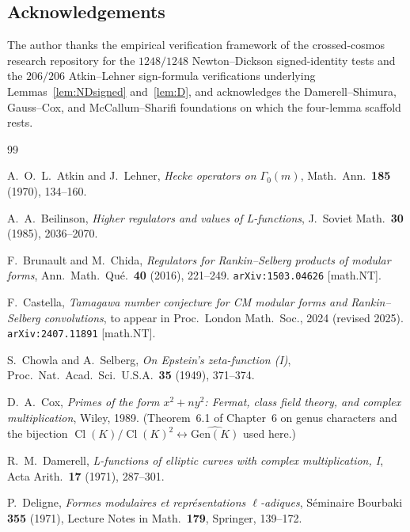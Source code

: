 \documentclass[11pt,a4paper]{amsart}
\theoremstyle{plain}
\theoremstyle{definition}
\DeclareMathOperator{\Cl}{Cl}
\begin{document}
\subsection*{Acknowledgements}

The author thanks the empirical verification framework of the
crossed-cosmos research repository for the $1248/1248$ Newton--Dickson
signed-identity tests and the $206/206$ Atkin--Lehner sign-formula
verifications underlying Lemmas~\ref{lem:NDsigned} and~\ref{lem:D},
and acknowledges the Damerell--Shimura, Gauss--Cox, and
McCallum--Sharifi foundations on which the four-lemma scaffold rests.

\begin{thebibliography}{99}

A.~O.~L.~Atkin and J.~Lehner,
\textit{Hecke operators on $\Gamma_0(m)$},
Math.\ Ann.\ \textbf{185} (1970), 134--160.

A.~A.~Beilinson,
\textit{Higher regulators and values of L-functions},
J.\ Soviet Math.\ \textbf{30} (1985), 2036--2070.

F.~Brunault and M.~Chida,
\textit{Regulators for Rankin--Selberg products of modular forms},
Ann.\ Math.\ Qu\'e.\ \textbf{40} (2016), 221--249.
\texttt{arXiv:1503.04626} [math.NT].

F.~Castella,
\textit{Tamagawa number conjecture for CM modular forms and
Rankin--Selberg convolutions},
to appear in Proc.\ London Math.\ Soc., 2024 (revised 2025).
\texttt{arXiv:2407.11891} [math.NT].

S.~Chowla and A.~Selberg,
\textit{On Epstein's zeta-function (I)},
Proc.\ Nat.\ Acad.\ Sci.\ U.S.A.\ \textbf{35} (1949), 371--374.

D.~A.~Cox,
\emph{Primes of the form $x^2 + n y^2$: Fermat, class field theory, and
complex multiplication},
Wiley, 1989.
(Theorem~6.1 of Chapter~6 on genus characters and the bijection
$\Cl(K)/\Cl(K)^2 \leftrightarrow \widehat{\mathrm{Gen}(K)}$ used here.)

R.~M.~Damerell,
\textit{L-functions of elliptic curves with complex multiplication, I},
Acta Arith.\ \textbf{17} (1971), 287--301.

P.~Deligne,
\textit{Formes modulaires et repr\'esentations $\ell$-adiques},
S\'eminaire Bourbaki \textbf{355} (1971), Lecture Notes in Math.\
\textbf{179}, Springer, 139--172.


\end{thebibliography}
\end{document}
